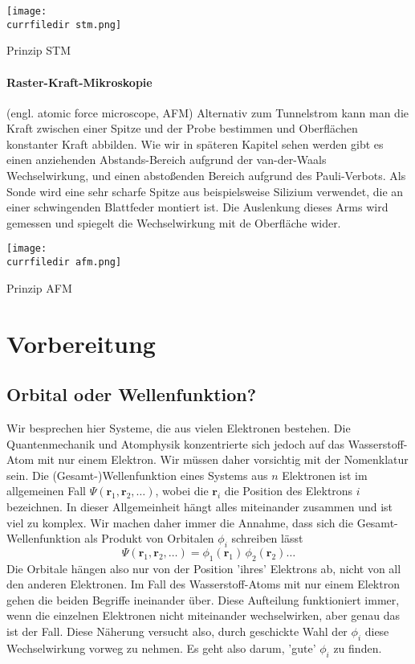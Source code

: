 \begin{marginfigure}
\texttt{[image: \\currfiledir stm.png]}
\caption{Prinzip STM}
\end{marginfigure}


\paragraph{Raster-Kraft-Mikroskopie} (engl. atomic force microscope, AFM) Alternativ zum Tunnelstrom kann man die Kraft zwischen einer Spitze und der Probe bestimmen und Oberflächen konstanter Kraft abbilden. Wie wir in späteren Kapitel sehen werden gibt es einen anziehenden Abstands-Bereich aufgrund der van-der-Waals Wechselwirkung, und einen abstoßenden Bereich aufgrund des Pauli-Verbots. Als Sonde wird eine sehr scharfe Spitze aus beispielsweise Silizium verwendet, die an einer schwingenden Blattfeder montiert ist. Die Auslenkung dieses Arms wird gemessen und spiegelt die Wechselwirkung mit de Oberfläche wider.


\begin{marginfigure}
\texttt{[image: \\currfiledir afm.png]}
\caption{Prinzip AFM}
\end{marginfigure}

 
\section{Vorbereitung}


\subsection{Orbital oder Wellenfunktion?}

Wir besprechen hier Systeme, die  aus vielen Elektronen bestehen. Die Quantenmechanik und Atomphysik konzentrierte sich jedoch auf das Wasserstoff-Atom mit nur einem Elektron. Wir müssen daher vorsichtig mit der Nomenklatur sein. Die (Gesamt-)Wellenfunktion eines Systems aus $n$ Elektronen ist im allgemeinen Fall $\Psi(\mathbf{r}_1, \mathbf{r}_2, \dots)$, wobei die $\mathbf{r}_i$ die Position des Elektrons $i$ bezeichnen. In dieser Allgemeinheit hängt alles miteinander zusammen und ist viel zu komplex. Wir machen daher immer die Annahme, dass sich die Gesamt-Wellenfunktion als Produkt von Orbitalen $\phi_i$ schreiben lässt
\begin{equation}
\Psi(\mathbf{r}_1, \mathbf{r}_2, \dots) = \phi_1(\mathbf{r}_1) \, \phi_2(\mathbf{r}_2)  \dots
\end{equation}
Die Orbitale hängen also nur von der Position 'ihres' Elektrons ab, nicht von all den anderen Elektronen. Im Fall des Wasserstoff-Atoms mit nur einem Elektron gehen die beiden Begriffe ineinander über.
Diese Aufteilung funktioniert immer, wenn die einzelnen Elektronen nicht miteinander wechselwirken, aber genau das ist der Fall. Diese Näherung versucht also, durch geschickte Wahl der $\phi_i$ diese Wechselwirkung vorweg zu nehmen. Es geht also darum, 'gute' $\phi_i$ zu finden.

